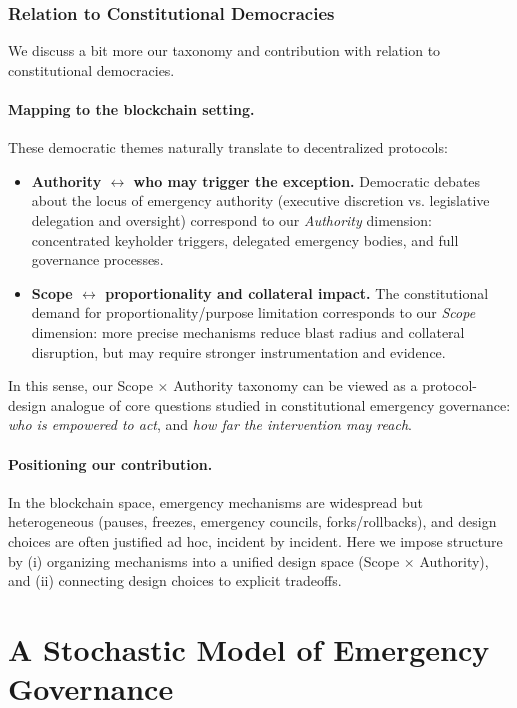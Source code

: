 \documentclass[12pt]{article}
\begin{document}
\subsubsection{Relation to Constitutional Democracies}

We discuss a bit more our taxonomy and contribution with relation to constitutional democracies.

\paragraph{Mapping to the blockchain setting.}
These democratic themes naturally translate to decentralized protocols:
\begin{itemize}
    \item \textbf{Authority $\leftrightarrow$ who may trigger the exception.}
    Democratic debates about the locus of emergency authority (executive discretion vs. legislative
    delegation and oversight) correspond to our \emph{Authority} dimension: concentrated keyholder
    triggers, delegated emergency bodies, and full governance processes.
    \item \textbf{Scope $\leftrightarrow$ proportionality and collateral impact.}
    The constitutional demand for proportionality/purpose limitation corresponds to our \emph{Scope}
    dimension: more precise mechanisms reduce blast radius and collateral disruption, but may require
    stronger instrumentation and evidence.
\end{itemize}
In this sense, our Scope $\times$ Authority taxonomy can be viewed as a protocol-design analogue of
core questions studied in constitutional emergency governance: \emph{who is empowered to act}, and
\emph{how far the intervention may reach}.

\paragraph{Positioning our contribution.}
In the blockchain space, emergency mechanisms are widespread but heterogeneous (pauses, freezes,
emergency councils, forks/rollbacks), and design choices are often justified ad hoc, incident by
incident. Here we impose structure by (i) organizing mechanisms into a unified design space
(Scope $\times$ Authority), and (ii) connecting design choices to explicit tradeoffs.
\fi


\section{A Stochastic Model of Emergency Governance}
\label{sec:theory}
\end{document}
